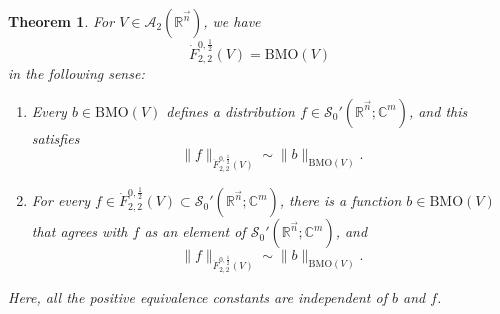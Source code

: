\documentclass[11pt, reqno]{amsart}
\newtheorem{theorem}{Theorem}[section]
\theoremstyle{definition}
\theoremstyle{remark}
\numberwithin{equation}{section}
\newcommand{\A}{\mathscr A}
\newcommand{\C}{\mathbb C}
\newcommand{\R}{\mathbb R}
\newcommand{\Sc}{\mathscr S}
\newcommand{\vn}{\vec n}
\newcommand{\Norm}[2]{\|#1\|_{#2}}
\begin{document}
\begin{theorem} \label{coin BMO}
For $V\in\A_2(\R^{\vn})$, we have
\begin{equation*}
\dot F^{0,\frac12}_{2,2}(V)=\mathrm{BMO}(V)
\end{equation*}
in the following sense:
\begin{enumerate}[\rm(i)]
\item Every $b\in \mathrm{BMO}(V)$ defines a distribution $f\in\Sc_0'(\R^{\vn};\C^m)$, and this satisfies
\begin{equation*}
\Norm{f}{\dot F^{0,\frac12}_{2,2}(V)}\sim\Norm{b}{\mathrm{BMO}(V)}.
\end{equation*}

\item For every $f\in\dot F^{0,\frac12}_{2,2}(V)\subset\Sc_0'(\R^{\vn};\C^m)$, there is a function $b\in \mathrm{BMO}(V)$ that agrees with $f$ as an element of $\Sc_0'(\R^{\vn};\C^m)$, and
\begin{equation*}
\Norm{f}{\dot F^{0,\frac12}_{2,2}(V)}\sim\Norm{b}{\mathrm{BMO}(V)}.
\end{equation*}
\end{enumerate}
Here, all the positive equivalence constants are independent of $b$ and $f$.
\end{theorem}
\end{document}
